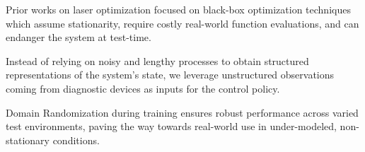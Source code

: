 {Prior works on laser optimization focused on black-box optimization techniques which assume stationarity, require costly real-world function evaluations, and can endanger the system at test-time.}

{Instead of relying on noisy and lengthy processes to obtain structured representations of the system's state, we leverage unstructured observations coming from diagnostic devices as inputs for the control policy.}

{Domain Randomization during training ensures robust performance across varied test environments, paving the way towards real-world use in under-modeled, non-stationary conditions.}